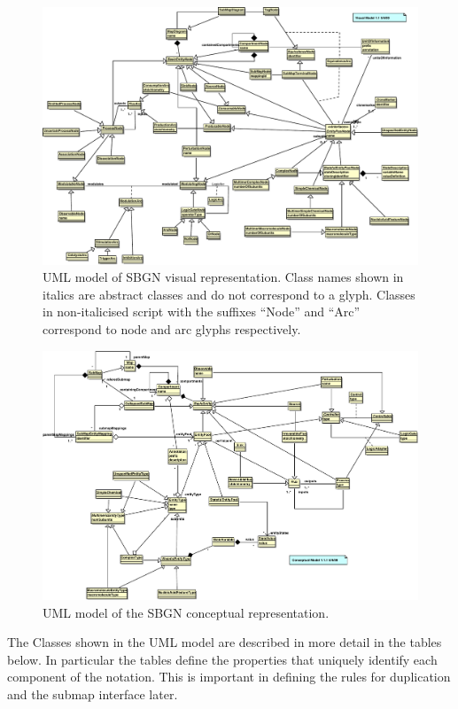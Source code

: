  \begin{landscape}
\begin{figure}[p]
\begin{center}
\includegraphics[width=0.85\linewidth]{images/sbgn_visual}
\caption{UML model of SBGN visual representation. Class names shown in italics are abstract classes and do not correspond to a glyph. Classes in non-italicised script with the suffixes ``Node'' and ``Arc'' correspond to node and arc glyphs respectively.}
\label{fig:sbgn_visual}
\end{center}
\end{figure}

\begin{figure}[p]
\begin{center}
\includegraphics[width=0.85\linewidth]{images/sbgn_conceptual}
\caption{UML model of the SBGN conceptual representation.}
\label{fig:sbgn_conceptual}
\end{center}
\end{figure}
\end{landscape}
The Classes shown in the UML model are described in more detail in the
tables below. In particular the tables define the properties that
uniquely identify each component of the notation. This is important in
defining the rules for duplication and the submap interface later.

